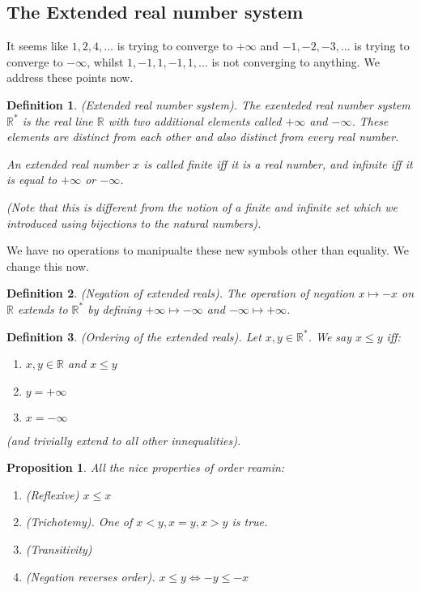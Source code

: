 \documentclass{article}
\newtheorem{definition}{Definition}[subsection]
\newtheorem{proposition}{Proposition}[subsection]
\newcommand{\R}{\mathbb{R}}
\begin{document}
\subsection{The Extended real number system}

It seems like $1,2,4,\dots$ is trying to converge 
to $+ \infty$ and $-1,-2,-3,\dots$ is trying
to converge to $- \infty$, whilst 
$1, -1, 1, -1, 1, \dots$ is not converging
to anything. We address these points now. 

\begin{definition}
	(Extended real number system). The 
	exenteded real number system $\R^*$ 
	is the real line $\R$ with two 
	additional elements called 
	$+ \infty$ and $- \infty$. These 
	elements are distinct from 
	each other and also distinct
	from every real number. 
	
	An extended real number $x$ 
	is called finite iff it is a real 
	number, and infinite iff it is 
	equal to $+ \infty$ or $- \infty$.

	(Note that this is different 
	from the notion of a finite
	and infinite set which 
	we introduced using 
	bijections to the 
	natural numbers).
\end{definition}

We have no operations to manipualte
these new symbols other than 
equality. We change this now.

\begin{definition}
	(Negation of extended reals). The 
	operation of negation $x \mapsto -x$ 
	on $\R$ extends to $\R^*$ 
	by defining  $+ \infty \mapsto - \infty$ 
	and $- \infty \mapsto + \infty$.
\end{definition}

\begin{definition}
	(Ordering of the extended reals). 
	Let $x,y \in \R^*$. We 
	say $x \leq y$ iff:
	\begin{enumerate}[label=(\alph*)]
		\item $x,y \in\R$ and $x \leq y$
		\item $y = + \infty$
		\item $x = - \infty$
	\end{enumerate}
	(and trivially extend to all other innequalities).
\end{definition}

\begin{proposition}
	All the nice properties of order reamin:	

	\begin{enumerate}[label=(\alph*)]
		\item (Reflexive) $x \leq x$
		\item (Trichotemy). One of 
			$x < y, x=y, x > y$ is true.
		\item (Transitivity)
		\item (Negation reverses order).
			$x \leq y \iff -y \leq -x$
	\end{enumerate}
\end{proposition}
\end{document}
